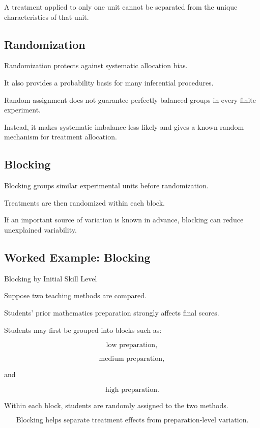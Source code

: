 A treatment applied to only one unit cannot be separated from the unique
characteristics of that unit.

\subsection{Randomization}
\label{subsec:randomization-experimental-design}

Randomization protects against systematic allocation bias.

It also provides a probability basis for many inferential procedures.

Random assignment does not guarantee perfectly balanced groups in every
finite experiment.

Instead, it makes systematic imbalance less likely and gives a known
random mechanism for treatment allocation.

\subsection{Blocking}
\label{subsec:blocking}

Blocking groups similar experimental units before randomization.

Treatments are then randomized within each block.

If an important source of variation is known in advance, blocking can
reduce unexplained variability.

\subsection{Worked Example: Blocking}
\label{subsec:worked-blocking}

\begin{workedexamplebox}{Blocking by Initial Skill Level}

Suppose two teaching methods are compared.

Students' prior mathematics preparation strongly affects final scores.

Students may first be grouped into blocks such as:

\[
\text{low preparation},
\]

\[
\text{medium preparation},
\]

and

\[
\text{high preparation}.
\]

Within each block, students are randomly assigned to the two methods.

\begin{answerbox}
\[
\boxed{
\text{Blocking helps separate treatment effects from preparation-level
variation.}
}
\]
\end{answerbox}

\end{workedexamplebox}

